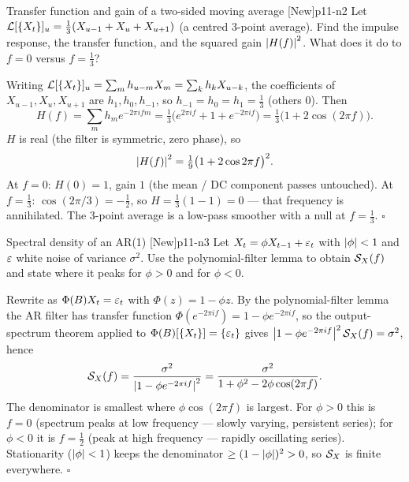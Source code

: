 \begin{exercise}{Transfer function and gain of a two-sided moving average \quad\textnormal{[New]}}{p11-n2}
Let $\mathcal{L}[\{X_t\}]_u=\tfrac13(X_{u-1}+X_u+X_{u+1})$ (a centred 3-point average).
Find the impulse response, the transfer function, and the squared gain
$\left\lvert H(f) \right\rvert^2$. What does it do to $f=0$ versus $f=\tfrac13$?
\end{exercise}
\begin{solution}
Writing $\mathcal{L}[\{X_t\}]_u=\sum_m h_{u-m}X_m=\sum_k h_k X_{u-k}$, the coefficients
of $X_{u-1},X_u,X_{u+1}$ are $h_1,h_0,h_{-1}$, so
$h_{-1}=h_0=h_1=\tfrac13$ (others $0$). Then
\[
H(f)=\sum_m h_m e^{-2\pi i f m}=\tfrac13\big(e^{2\pi i f}+1+e^{-2\pi i f}\big)
=\tfrac13\big(1+2\cos(2\pi f)\big).
\]
$H$ is real (the filter is symmetric, zero phase), so
\[
\left\lvert H(f) \right\rvert^2=\tfrac19\big(1+2\cos 2\pi f\big)^2 .
\]
At $f=0$: $H(0)=1$, gain $1$ (the mean / DC component passes untouched). At
$f=\tfrac13$: $\cos(2\pi/3)=-\tfrac12$, so $H=\tfrac13(1-1)=0$ --- that frequency
is annihilated. The 3-point average is a low-pass smoother with a null at
$f=\tfrac13$. \hfill$\square$
\end{solution}

\begin{exercise}{Spectral density of an AR(1) \quad\textnormal{[New]}}{p11-n3}
Let $X_t=\phi X_{t-1}+\varepsilon_t$ with $\left\lvert \phi \right\rvert<1$ and $\varepsilon$ white noise of
variance $\sigma^2$. Use the polynomial-filter lemma to obtain $\mathcal{S}_X(f)$ and
state where it peaks for $\phi>0$ and for $\phi<0$.
\end{exercise}
\begin{solution}
Rewrite as $\Phi(B)X_t=\varepsilon_t$ with $\Phi(z)=1-\phi z$. By the
polynomial-filter lemma the AR filter has transfer function
$\Phi(e^{-2\pi i f})=1-\phi e^{-2\pi i f}$, so the output-spectrum theorem
applied to $\Phi(B)[\{X_t\}]=\{\varepsilon_t\}$ gives
$\left\lvert 1-\phi e^{-2\pi i f} \right\rvert^2\mathcal{S}_X(f)=\sigma^2$, hence
\[
\mathcal{S}_X(f)=\frac{\sigma^2}{\left\lvert 1-\phi e^{-2\pi i f} \right\rvert^2}
=\frac{\sigma^2}{1+\phi^2-2\phi\cos(2\pi f)} .
\]
The denominator is smallest where $\phi\cos(2\pi f)$ is largest. For
$\phi>0$ this is $f=0$ (spectrum peaks at low frequency --- slowly varying,
persistent series); for $\phi<0$ it is $f=\tfrac12$ (peak at high frequency ---
rapidly oscillating series). Stationarity ($\left\lvert \phi \right\rvert<1$) keeps the denominator
$\ge(1-\left\lvert \phi \right\rvert)^2>0$, so $\mathcal{S}_X$ is finite everywhere. \hfill$\square$
\end{solution}

